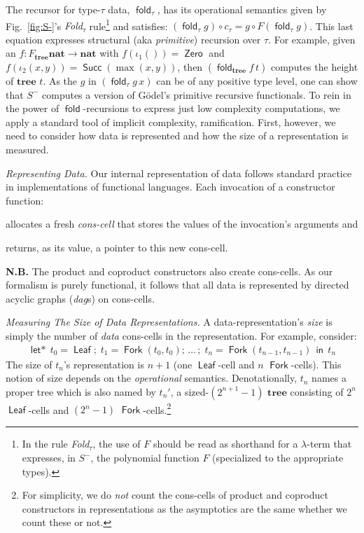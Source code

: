 \documentclass[envcountsame]{llncs}
\newcommand{\key}[1]{\ensuremath{\mathop{\mathsf{#1}}\nolimits}\xspace}
\newcommand{\In}{\key{in}}
\newcommand{\Letstar}{\key{let*}}
\newcommand{\fold}{\key{fold}}
\newcommand{\type}[1]{\ensuremath{\mathbf{#1}}\xspace}
\newcommand{\Nat}{\type{nat}}
\newcommand{\Tree}{\type{tree}}
\newcommand{\constr}[1]{\ensuremath{\mathop{\mathsf{#1}}\nolimits}\xspace}
\newcommand{\Zero}{\constr{Zero}}
\newcommand{\Succ}{\constr{Succ}}
\newcommand{\Leaf}{\constr{Leaf}}
\newcommand{\Fork}{\constr{Fork}}
\newcommand{\Topic}[1]{\smallskip\noindent{\textbf{#1{.}}}\enspace}
\newcommand{\of}{\colon}
\renewcommand{\colon}{\mathpunct{:}}
\begin{document}
The recursor for type-$\tau$ data, $\fold_\tau$, has its operational
semantics given by Fig.~\ref{fig:S-}'s 
\emph{Fold$_\tau$} rule\footnote{In the rule \emph{Fold}$_\tau$, the use of $F$ should be
          read as shorthand for a $\lambda$-term that
          expresses,  in $S^-$, the polynomial function $F$ 
          (specialized to the appropriate types).}
and satisfies: 
$(\fold_\tau g)\circ c_\tau = g \circ F(\fold_\tau g)$.
This last equation expresses structural (aka \emph{primitive}) 
recursion over $\tau$.  For example, given  an 
$f\of F_{\Tree}\Nat \to\Nat$ with 
$f(\iota_1())=\Zero$ and $f(\iota_2(x,y))=\Succ(\max(x,y))$,
then $(\fold_{\Tree} f \,t)$ computes the height of $\Tree$ $t$. 
As the  $g$ in $(\fold_{\tau} g \,x)$ can be of any positive
type level, one can show that $S^-$ computes a
version of G\"{o}del's primitive recursive functionals. 
To rein in the  power of $\fold$-recursions to express just low 
complexity computations,  we apply a standard tool of implicit 
complexity, ramification. 
First, however, we need to consider how data is represented 
and how the size of a representation is measured.

\Topic{Representation, Size, and Memoization}
\emph{Representing Data.} 
Our internal representation of data
follows standard practice in implementations of
functional languages.  Each invocation of a constructor function:
\begin{inparaenum}[\it (i)]
  \item 
    allocates a fresh \emph{cons-cell} that stores the values of 
    the invocation's arguments and 
  \item 
    returns, as its value, a pointer to this new cons-cell.
\end{inparaenum}    
\textbf{N.B.} The product and coproduct constructors also create
cons-cells. 
As our formalism is purely functional, it follows that all data is
represented by directed acyclic graphs (\emph{dag}s) on cons-cells.

\emph{Measuring The Size of Data Representations.}
A data-representation's \emph{size} is simply the number of
\emph{data} cons-cells in the representation.  For example,
consider:
\begin{gather}\label{e:tn}
  \Letstar \, t_0 = \Leaf;\;
           t_1=\Fork(t_0,t_0);\,
	         \dots\,;\;
           t_n=\Fork(t_{n-1},t_{n-1}) 
           \,\In\, t_n
\end{gather}
The size of $t_n$'s representation is $n+1$ (one \Leaf-cell and $n$
\Fork-cells).  This notion of size depends on the \emph{operational}
semantics.  Denotationally, $t_n$ names a proper tree which is also
named by $t_n'$, a sized-$(2^{n+1}-1)$ $\Tree$ consisting of $2^n$
\Leaf-cells and $(2^n-1)$ \Fork-cells.\footnote{ For simplicity, we
  do \emph{not} count the cons-cells of product and coproduct
  constructors in representations as the asymptotics
  are the same whether we count these or not.}
\end{document}
